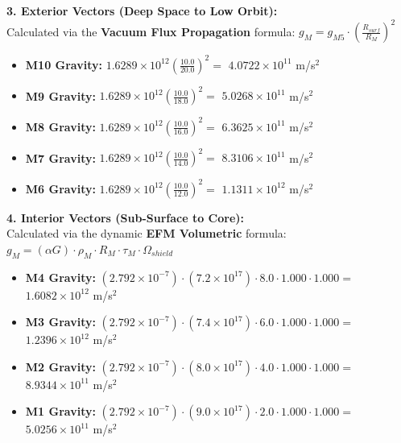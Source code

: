 \documentclass[11pt, a4paper]{article}
\begin{document}
  \clearpage
  \noindent \textbf{3. Exterior Vectors (Deep Space to Low Orbit):} \\
  \hspace*{1em} Calculated via the \textbf{Vacuum Flux Propagation} formula: $g_M = g_{M5} \cdot \left( \frac{R_{surf}}{R_M} \right)^2$
  \begin{itemize}
    \item \textbf{M10 Gravity:} $1.6289 \times 10^{12} \left( \frac{10.0}{20.0} \right)^2 =$ \textbf{$4.0722 \times 10^{11}$} m/s$^2$
    \item \textbf{M9 Gravity:} $1.6289 \times 10^{12} \left( \frac{10.0}{18.0} \right)^2 =$ \textbf{$5.0268 \times 10^{11}$} m/s$^2$
    \item \textbf{M8 Gravity:} $1.6289 \times 10^{12} \left( \frac{10.0}{16.0} \right)^2 =$ \textbf{$6.3625 \times 10^{11}$} m/s$^2$
    \item \textbf{M7 Gravity:} $1.6289 \times 10^{12} \left( \frac{10.0}{14.0} \right)^2 =$ \textbf{$8.3106 \times 10^{11}$} m/s$^2$
    \item \textbf{M6 Gravity:} $1.6289 \times 10^{12} \left( \frac{10.0}{12.0} \right)^2 =$ \textbf{$1.1311 \times 10^{12}$} m/s$^2$
  \end{itemize}

  \vspace{0.5em}
  \noindent \textbf{4. Interior Vectors (Sub-Surface to Core):} \\[0.5em]
  \hspace*{1em} Calculated via the dynamic \textbf{EFM Volumetric} formula: $g_M = (\alpha G) \cdot \rho_{M} \cdot R_M \cdot \tau_M \cdot \Omega_{shield}$
  \begin{itemize}
    \item \textbf{M4 Gravity:} $(2.792 \times 10^{-7}) \cdot (7.2 \times 10^{17}) \cdot 8.0 \cdot 1.000 \cdot 1.000 =$ \textbf{$1.6082 \times 10^{12}$} m/s$^2$
    \item \textbf{M3 Gravity:} $(2.792 \times 10^{-7}) \cdot (7.4 \times 10^{17}) \cdot 6.0 \cdot 1.000 \cdot 1.000 =$ \textbf{$1.2396 \times 10^{12}$} m/s$^2$
    \item \textbf{M2 Gravity:} $(2.792 \times 10^{-7}) \cdot (8.0 \times 10^{17}) \cdot 4.0 \cdot 1.000 \cdot 1.000 =$ \textbf{$8.9344 \times 10^{11}$} m/s$^2$
    \item \textbf{M1 Gravity:} $(2.792 \times 10^{-7}) \cdot (9.0 \times 10^{17}) \cdot 2.0 \cdot 1.000 \cdot 1.000 =$ \textbf{$5.0256 \times 10^{11}$} m/s$^2$
  \end{itemize}
\end{document}
